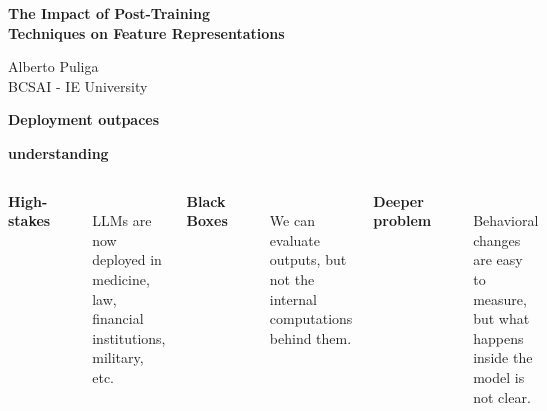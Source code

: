 \documentclass[aspectratio=169,11pt]{beamer}
\newcommand{\ghost}[1]{{\color{paper}#1}}
\begin{document}
\begin{frame}[plain]
  \vspace{0.95cm}
  {\color{ink}\Huge\textbf{The Impact of Post-Training}}\\[0.12cm]
  {\color{ink}\Huge\textbf{Techniques on Feature Representations}}

  \vspace{1.25cm}
  {\color{muted}\normalsize Alberto Puliga}\\[0.08cm]
  {\color{muted}\normalsize BCSAI - IE University}
\end{frame}

\begin{frame}[plain]
  \vspace*{0pt}
  {\color{ink}\fontsize{22}{24}\selectfont\textbf{Deployment outpaces}\par}
  \vspace{-0.06cm}
  {\color{ink}\fontsize{22}{24}\selectfont\textbf{understanding}\par}

  \vspace{0.8cm}
  \begin{columns}[T,totalwidth=\textwidth]
    {\Large\color{ink}\textbf{High-stakes}}\\[0.16cm]
    {\color{muted}\rule{\linewidth}{0.35pt}}\\[0.16cm]
    {\normalsize\color{inktwo}LLMs are now deployed in medicine, law, financial institutions, military, etc.}

    {\Large\ghost{\textbf{Black Boxes}}}\\[0.16cm]
    {\ghost{\rule{\linewidth}{0.35pt}}}\\[0.16cm]
    {\normalsize\ghost{We can evaluate outputs, but not the internal computations behind them.}}

    {\Large\ghost{\textbf{Deeper problem}}}\\[0.16cm]
    {\ghost{\rule{\linewidth}{0.35pt}}}\\[0.16cm]
    {\normalsize\ghost{Behavioral changes are easy to measure, but what happens inside the model is not clear.}}
  \end{columns}
\end{frame}
\end{document}
